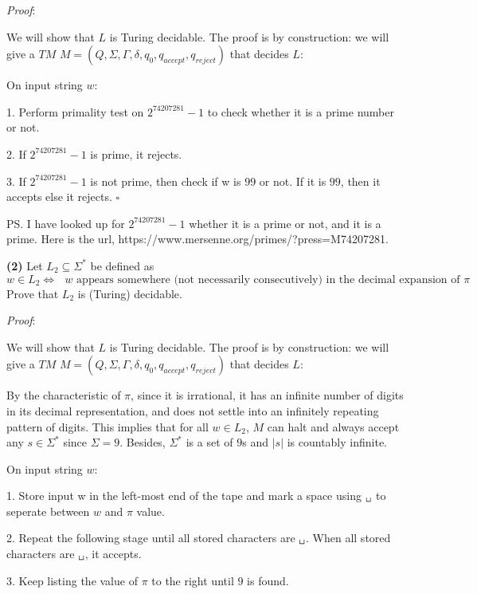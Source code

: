 \documentclass[a4paper, 11pt]{article}
\renewcommand{\part}[1] {\vspace{.10in} {\bf (#1)}}
\newcommand\tab[1][1cm]{\hspace*{#1}}
\begin{document}
	{\em Proof}:  %
	
	We will show that $L$ is Turing decidable. The proof is by construction: we will give a $TM$ $M = (Q, \Sigma, \Gamma, \delta, q_0 , q_{accept} , q_{reject})$ that decides $L$:
	
	On input string $w$:
	
	1. Perform primality test on $2^{74207281}-1$ to check whether it is a prime number or not.
	
	2. If $2^{74207281}-1$ is prime, it rejects.
	
	3. If $2^{74207281}-1$ is not prime, then check if w is $99$ or not. If it is $99$, then it accepts else it rejects. $\square$
	
	PS. 	
	I have looked up for $2^{74207281}-1$ whether it is a prime or not, and it is a prime. Here is the url, https://www.mersenne.org/primes/?press=M74207281.
	
	\part{2} Let $L_2 \subseteq \Sigma^*$ be defined as
	$$
 	w \in L_2 \iff \text{ $w$ appears somewhere (not necessarily consecutively) in the decimal expansion of $\pi$}
	$$
	Prove that $L_2$ is (Turing) decidable.
	
	
	{\em Proof}: %
	
	We will show that $L$ is Turing decidable. The proof is by construction: we will give a $TM$ $M = (Q, \Sigma, \Gamma, \delta, q_0 , q_{accept} , q_{reject})$ that decides $L$:
	
	By the characteristic of $\pi$, since it is irrational, it has an infinite number of digits in its decimal representation, and does not settle into an infinitely repeating pattern of digits. This implies that for all $w \in L_2$, $M$ can halt and always accept any $s \in \Sigma^*$ since $\Sigma = {9}$. Besides, $\Sigma^*$ is a set of $9$s and $|s|$ is countably infinite.
	
	On input string $w$:
	
	1. Store input w in the left-most end of the tape and mark a space using $\texttt{\char32}$ to seperate between $w$ and $\pi$ value.
	
	2. Repeat the following stage until all stored characters are $\texttt{\char32}$. When all stored characters are $\texttt{\char32}$, it accepts.
	
	\tab	3. Keep listing the value of $\pi$ to the right until $9$ is found.
	
\end{document}
